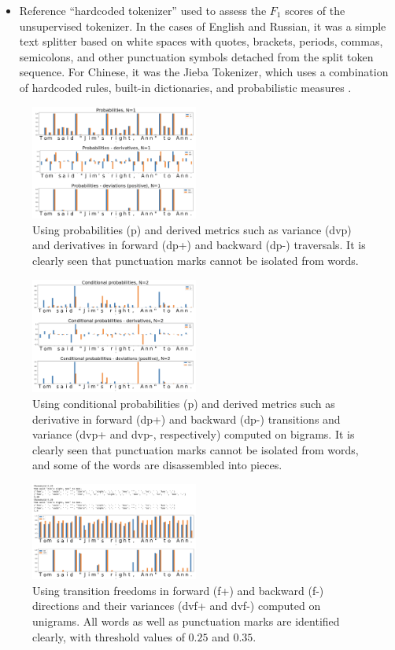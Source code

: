 \documentclass[11pt]{article}
\begin{document}
\begin{itemize}
\item Reference “hardcoded tokenizer” used to assess the $F_1$ scores of the unsupervised tokenizer. In the cases of English and Russian, it was a simple text splitter based on white spaces with quotes, brackets, periods, commas, semicolons, and other punctuation symbols detached from the split token sequence. For Chinese, it was the Jieba Tokenizer, which uses a combination of hardcoded rules, built-in dictionaries, and probabilistic measures \citep{18}. 
\end{itemize}

\begin{figure}
  \includegraphics[width=0.49\textwidth]{imgs/figure1.png}
  \caption{Using probabilities (p) and derived metrics such as variance (dvp) and derivatives in forward (dp+) and backward (dp-) traversals. It is clearly seen that punctuation marks cannot be isolated from words.}
\end{figure}

\begin{figure}[!ht]
  \includegraphics[width=0.49\textwidth]{imgs/figure2.png}
  \caption{Using conditional probabilities (p) and derived metrics such as derivative in forward (dp+) and backward (dp-) transitions and variance (dvp+ and dvp-, respectively) computed on bigrams. It is clearly seen that punctuation marks cannot be isolated from words, and some of the words are disassembled into pieces.}
\end{figure}

\begin{figure}[!ht]
  \includegraphics[width=0.49\textwidth]{imgs/figure3.png}
  \caption{Using transition freedoms in forward (f+) and backward (f-) directions and their variances (dvf+ and dvf-) computed on unigrams. All words as well as punctuation marks are identified clearly, with threshold values of $0.25$ and $0.35$.}
\end{figure}
\end{document}
